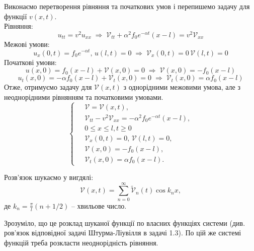 Виконаємо перетворення рівняння та початкових умов і перепишемо задачу для функції $v(x,t)$.\\
Рівняння:
\begin{equation*}
    u_{tt} = v^2 u_{xx}
    \;\Rightarrow\;
    \mathcal{V}_{tt} + \alpha^2 f_0 e^{-\alpha t} (x-l) = v^2\mathcal{V}_{xx} 
\end{equation*}
Межові умови:
\begin{equation*}
    u_x(0,t) = f_0 e^{-\alpha t}, \, u(l,t) = 0
    \;\Rightarrow\; 
    \mathcal{V}_x(0,t) = 0 \, \mathcal{V}(l,t) = 0
\end{equation*}
Початкові умови:
\begin{equation*}
    u(x,0) = f_0 (x-l) + \mathcal{V}(x,0) = 0
    \;\Rightarrow\;
    \mathcal{V}(x,0) = - f_0 (x-l)
\end{equation*}
\begin{equation*}
    u_t(x,0) = -\alpha f_0 (x-l) + \mathcal{V}_t(x,0) = 0
    \;\Rightarrow\;
    \mathcal{V}_t(x,0) = \alpha f_0  (x-l)
\end{equation*}
Отже, отримуємо задачу для $\mathcal{V}(x,t)$ з однорідними межовими умова, але з неоднорідними рівнянням та початковими умовами.
\begin{equation} \label{new-cond7,1}
    \left\{ \begin{aligned} %
            \;&\mathcal{V} = \mathcal{V}(x,t), \\
            &\mathcal{V}_{tt} - v^2 \mathcal{V}_{xx} = -\alpha^2 f_0 e^{-\alpha t} (x-l), \\
            &0 \leq x \leq l, t \geq 0 \\
            &\mathcal{V}_x(0,t) = 0, \, \mathcal{V}(l,t) = 0, \\
            &\mathcal{V}(x,0) = - f_0 (x-l),\\
            &\mathcal{V}_t(x,0) = \alpha f_0 (x-l).
    \end{aligned} \right.
\end{equation}

Розв'язок шукаємо у вигдялі:
\begin{equation}
    \mathcal{V}(x,t) = \sum_{n=0}^\infty \widetilde{\mathcal{V}}_n(t) \cos k_n x,
\end{equation}
де $k_n = \frac{\pi}{l}(n + 1/2)$ -- хвильове число.

Зрозуміло, що це розклад шуканої функції по власних функціях системи (див. ров'язок відповідної задачі Штурма-Ліувілля в задачі 1.3). По цій же системі функцій треба розкласти неоднорідність рівняння.


